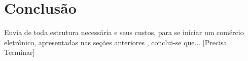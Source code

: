 \chapter{Conclusão}

Envia de toda estrutura necessária e seus custos, para se iniciar um comércio eletrônico, apresentadas nas seções anteriores , conclui-se que... [Precisa Terminar]

